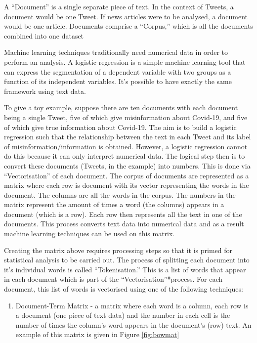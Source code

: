 \documentclass[
]{article}
\providecommand{\tightlist}{%
  \setlength{\itemsep}{0pt}\setlength{\parskip}{0pt}}
\begin{document}
A ``Document'' is a single separate piece of text. In the context of
Tweets, a document would be one Tweet. If news articles were to be
analysed, a document would be one article. Documents comprise a
``Corpus,'' which is all the documents combined into one dataset

Machine learning techniques traditionally need numerical data in order
to perform an analysis. A logistic regression is a simple machine
learning tool that can express the segmentation of a dependent variable
with two groups as a function of its independent variables. It's
possible to have exactly the same framework using text data.

To give a toy example, suppose there are ten documents with each
document being a single Tweet, five of which give misinformation about
Covid-19, and five of which give true information about Covid-19. The
aim is to build a logistic regression such that the relationship between
the text in each Tweet and its label of misinformation/information is
obtained. However, a logistic regression cannot do this because it can
only interpret numerical data. The logical step then is to convert these
documents (Tweets, in the example) into numbers. This is done via
``Vectorisation'' of each document. The corpus of documents are
represented as a matrix where each row is document with its vector
representing the words in the document. The columns are all the words in
the corpus. The numbers in the matrix represent the amount of times a
word (the columns) appears in a document (which is a row). Each row then
represents all the text in one of the documents. This process converts
text data into numerical data and as a result machine learning
techniques can be used on this matrix.

Creating the matrix above requires processing steps so that it is primed
for statistical analysis to be carried out. The process of splitting
each document into it's individual words is called ``Tokenisation.''
This is a list of words that appear in each document which is part of
the ``Vectorisation''*process. For each document, this list of words is
vectorised using one of the following techniques:

\begin{enumerate}
\def\labelenumi{\arabic{enumi}.}
\tightlist
\item
  Document-Term Matrix - a matrix where each word is a column, each row
  is a document (one piece of text data) and the number in each cell is
  the number of times the column's word appears in the document's (row)
  text. An example of this matrix is given in Figure \ref{fig:bowmat}
\end{enumerate}
\end{document}
